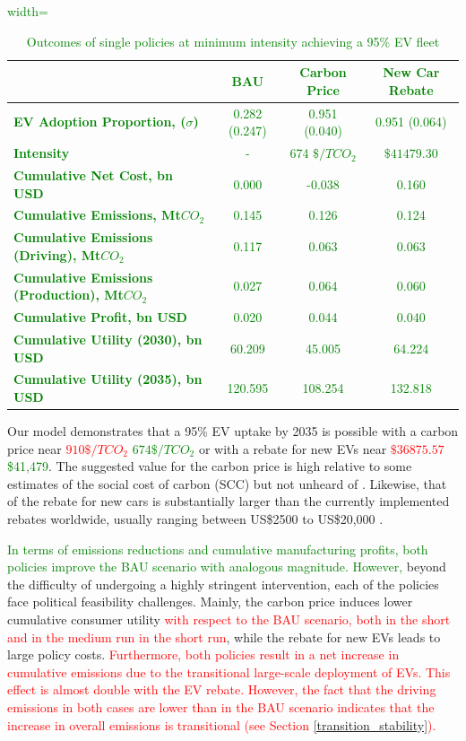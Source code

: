 \documentclass[12pt]{article}
\begin{document}
\textcolor{green}{
    \begin{table}[h!]
	\centering
	\caption{Outcomes of single policies at minimum intensity achieving a 95\% EV fleet}
	\label{tab:policy_outcomes}
	\begin{adjustbox}{width=\textwidth}
		\begin{tabular}{lccc}
			\toprule
			& \textbf{BAU} & \textbf{Carbon Price} & \textbf{New Car Rebate} \\
			\midrule
			\textbf{EV Adoption Proportion, ($\sigma$)} & 0.282 (0.247) & 0.951 (0.040) & 0.951 (0.064) \\
			\textbf{Intensity} & - & 674 $\$/TCO_2$ & $\$41479.30$ \\
			\textbf{Cumulative Net Cost, bn USD} & 0.000 & -0.038 & 0.160 \\
			\textbf{Cumulative Emissions, Mt$CO_2$} & 0.145 & 0.126 & 0.124 \\
			\textbf{Cumulative Emissions (Driving), Mt$CO_2$} & 0.117 & 0.063 & 0.063 \\
			\textbf{Cumulative Emissions (Production), Mt$CO_2$} & 0.027 & 0.064 & 0.060 \\
			\textbf{Cumulative Profit, bn USD} & 0.020 & 0.044 & 0.040 \\
			\textbf{Cumulative Utility (2030), bn USD} & 60.209 & 45.005 & 64.224 \\
			\textbf{Cumulative Utility (2035), bn USD} & 120.595 & 108.254 & 132.818 \\
			\bottomrule
		\end{tabular}
	\end{adjustbox}
\end{table}}

	Our model demonstrates that a 95\% EV uptake by 2035 is possible with a carbon price near \textcolor{red}{$910\$/TCO_2$} \textcolor{green}{$674\$/TCO_2$} or with a rebate for new EVs near \textcolor{red}{$\$36875.57$} \textcolor{green}{\$41{,}479}. The suggested value for the carbon price is high relative to some estimates of the social cost of carbon (SCC) but not unheard of \citep{moore2024synthesis, bilal2024macroeconomic}. Likewise, that of the rebate for new cars is substantially larger than the currently implemented rebates worldwide, usually ranging between US\$2500 to US\$20,000 \cite{HARDMAN2017EVRebate}.

    \textcolor{green}{In terms of emissions reductions and cumulative manufacturing profits, both policies improve the BAU scenario with analogous magnitude. However,} beyond the difficulty of undergoing a highly stringent intervention, each of the policies face political feasibility challenges. Mainly, the carbon price induces lower cumulative consumer utility\textcolor{red}{ with respect to the BAU scenario, both in the short and in the medium run}\textcolor{red}{ in the short run}, while the rebate for new EVs leads to large policy costs. \textcolor{red}{Furthermore, both policies result in a net increase in cumulative emissions due to the transitional large-scale deployment of EVs. This effect is almost double with the EV rebate. However, the fact that the driving emissions in both cases are lower than in the BAU scenario indicates that the increase in overall emissions is transitional (see Section \ref{transition_stability}).}
\end{document}
